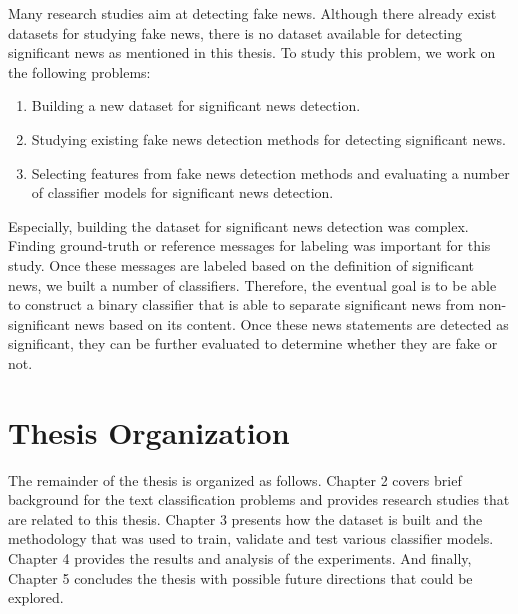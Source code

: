 Many research studies aim at detecting fake news. Although there already exist datasets for studying fake news, there is no dataset available for detecting significant news as mentioned in this thesis. To study this problem, we work on the following problems:

\begin{enumerate}
    \item Building a new dataset for significant news detection.
    \item Studying existing fake news detection methods for detecting significant news.
    \item Selecting features from fake news detection methods and evaluating a number of classifier models for significant news detection.
\end{enumerate}

Especially, building the dataset for significant news detection was complex. Finding ground-truth or reference messages for labeling was important for this study. Once these messages are labeled based on the definition of significant news, we built a number of classifiers. Therefore, the eventual goal is to be able to construct a binary classifier that is able to separate significant news from non-significant news based on its content. Once these news statements are detected as significant, they can be further evaluated to determine whether they are fake or not.

\section{Thesis Organization} \label{intro:organization}
The remainder of the thesis is organized as follows. Chapter 2 covers brief background for the text classification problems and provides research studies that are related to this thesis. Chapter 3 presents how the dataset is built and the methodology that was used to train, validate and test various classifier models. Chapter 4  provides the results and analysis of the experiments. And finally, Chapter 5 concludes the thesis with possible future directions that could be explored.